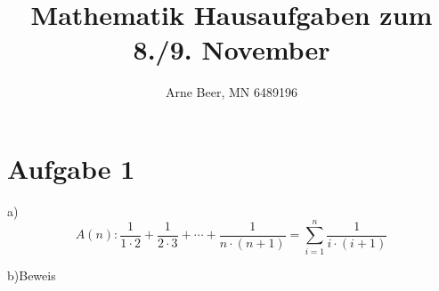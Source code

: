 \documentclass{article}
\title{Mathematik Hausaufgaben zum 8./9. November}
\author{Arne Beer, MN 6489196}
\begin{document}
\maketitle

\section{Aufgabe 1}
a)
\[ A(n):\frac{1}{1\cdot2}+\frac{1}{2\cdot3}+\cdots + \frac{1}{n\cdot(n+1)} =  \sum_{i=1}^n \frac{1}{i\cdot(i+1)} \]

b)Beweis
\end{document}
